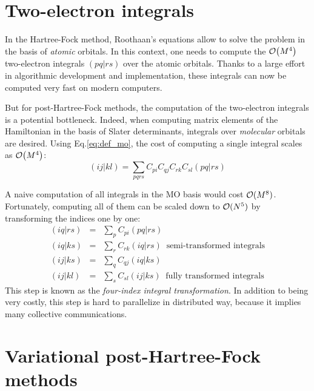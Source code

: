 \documentclass[./thesis.tex]{subfiles}
\begin{document}
\section{Two-electron integrals}

In the Hartree-Fock method, Roothaan's equations allow to solve the problem in the basis of 
\emph{atomic} orbitals.\cite{Roothaan_1951}
In this context, one needs to compute the $\order{M^4}$ two-electron integrals $(pq|rs)$ over the
atomic orbitals. Thanks to a large effort in algorithmic development and
implementation,\cite{Obara_1986,Head_Gordon_1988,Ten_no_1993,Gill_1989,Gill_1991,Libint2,Zhang_2018}
these integrals can now be computed very fast on modern computers.

But for post-Hartree-Fock methods, the computation of the two-electron
integrals is a potential bottleneck.
Indeed, when computing matrix elements of the Hamiltonian in the basis of
Slater determinants, integrals over \emph{molecular} orbitals are desired. Using
Eq.\eqref{eq:def_mo},
the cost of computing a single integral scales as $\order{M^4}$:
\begin{equation}
(ij|kl) = \sum_{pqrs} C_{pi} C_{qj} C_{rk} C_{sl} (pq|rs)
\end{equation}

A naive computation of all integrals in the MO basis would cost ${\cal O}(M^8)$. Fortunately, computing all of them can be scaled down to ${\cal O}(N^5)$ by transforming the indices one by one\cite{Wilson_1987}:
\begin{eqnarray}
(iq\vert rs) & = & \sum_{p} C_{pi} (pq|rs) \nonumber \\ 
(iq\vert ks) & = & \sum_{r} C_{rk} (iq|rs) \;\; \text{semi-transformed integrals} \\
(ij\vert ks) & = & \sum_{q} C_{qj} (iq|ks) \nonumber \\ 
(ij\vert kl) & = & \sum_{s} C_{sl} (ij|ks)  \;\; \text{fully transformed integrals}
\end{eqnarray}
This step is known as the \emph{four-index integral transformation}.  
In addition to being very costly, this step is hard to parallelize in
distributed way, because it implies many collective communications.\cite{Rajbhandari_2017,Limaye_1994,Fletcher_1999,Covick_1990}



\section{Variational post-Hartree-Fock methods}
\end{document}
